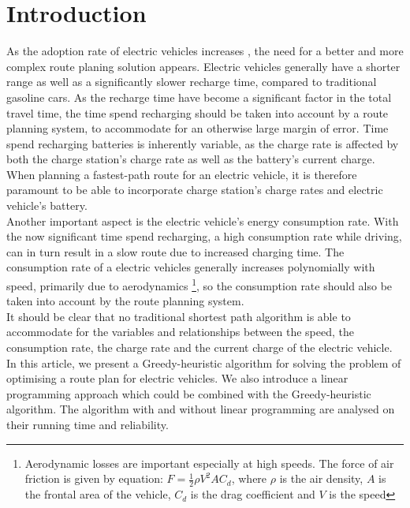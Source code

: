 \section{Introduction}

As the adoption rate of electric vehicles increases \cite{ev-sales-increasing}, the need for a better and more complex route planing solution appears. Electric vehicles generally have a shorter range as well as a significantly slower recharge time, compared to traditional gasoline cars. As the recharge time have become a significant factor in the total travel time, the time spend recharging should be taken into account by a route planning system, to accommodate for an otherwise large margin of error. Time spend recharging batteries is inherently variable, as the charge rate is affected by both the charge station's charge rate as well as the battery's current charge. When planning a fastest-path route for an electric vehicle, it is therefore paramount to be able to incorporate charge station's charge rates and electric vehicle's battery.\\

Another important aspect is the electric vehicle's energy consumption rate. With the now significant time spend recharging, a high consumption rate while driving, can in turn result in a slow route due to increased charging time. The consumption rate of a electric vehicles generally increases polynomially with speed, primarily due to aerodynamics \footnote{Aerodynamic losses are important especially at high speeds. The force of air friction is given by equation: $F = \frac{1}{2} \rho V^2 A C_d$, where $\rho$ is the air density, $A$ is the frontal area of the vehicle, $C_d$ is the drag coefficient and $V$ is the speed}, so the consumption rate should also be taken into account by the route planning system.\\

It should be clear that no traditional shortest path algorithm is able to accommodate for the variables and relationships between the speed, the consumption rate, the charge rate and the current charge of the electric vehicle. In this article, we present a Greedy-heuristic algorithm for solving the problem of optimising a route plan for electric vehicles. We also introduce a linear programming approach which could be combined with the Greedy-heuristic algorithm. The algorithm with and without linear programming are analysed on their running time and reliability.




